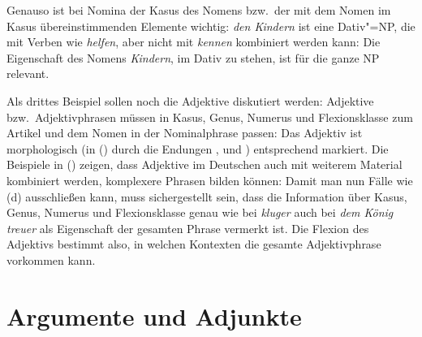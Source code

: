 Genauso ist bei Nomina der Kasus des Nomens bzw.\ der mit dem Nomen im Kasus übereinstimmenden
Elemente wichtig: \emph{den Kindern} ist eine Dativ"=NP, die mit Verben wie \emph{helfen}, aber
nicht mit \emph{kennen} kombiniert werden kann:
\eal
{}
\zl
Die Eigenschaft des Nomens \emph{Kindern}, im Dativ zu stehen, ist für die ganze NP relevant.

Als drittes Beispiel sollen noch die Adjektive diskutiert werden: Adjektive bzw.\ Adjektivphrasen
müssen in Kasus, Genus, Numerus und Flexionsklasse zum Artikel und dem Nomen in der Nominalphrase
passen:
\eal
{}
\zl
Das Adjektiv ist morphologisch (in () durch die Endungen ,  und
) entsprechend markiert. Die Beispiele in () zeigen, dass Adjektive im Deutschen
auch mit weiterem Material kombiniert werden, \dash komplexere Phrasen bilden können:
\eal
{}
\zl
Damit man nun Fälle wie (d) ausschließen kann, muss sichergestellt sein, dass die Information
über Kasus, Genus, Numerus und Flexionsklasse genau wie bei \emph{kluger} auch bei \emph{dem König
treuer} als Eigenschaft der gesamten Phrase vermerkt ist. Die Flexion des Adjektivs bestimmt also, in welchen Kontexten
die gesamte Adjektivphrase vorkommen kann.



\section{Argumente und Adjunkte}
\label{sec-intro-arg-adj}

